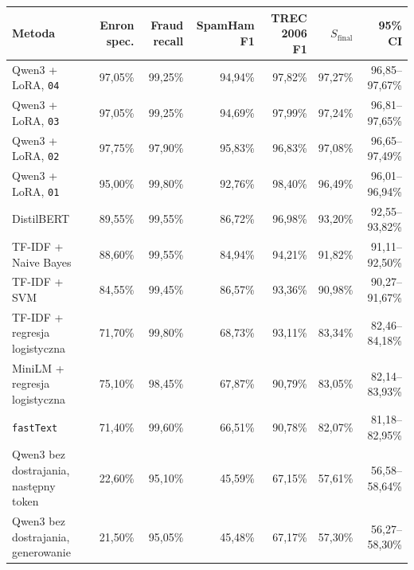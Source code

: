 \begin{tabular}{lrrrrrr}
\hline
\textbf{Metoda} & \textbf{Enron spec.} & \textbf{Fraud recall} & \textbf{SpamHam F1} & \textbf{TREC 2006 F1} & \textbf{\(S_{\mathrm{final}}\)} & \textbf{95\% CI} \\
\hline
Qwen3 + LoRA, \texttt{04} & 97,05\% & 99,25\% & 94,94\% & 97,82\% & 97,27\% & 96,85--97,67\% \\
Qwen3 + LoRA, \texttt{03} & 97,05\% & 99,25\% & 94,69\% & 97,99\% & 97,24\% & 96,81--97,65\% \\
Qwen3 + LoRA, \texttt{02} & 97,75\% & 97,90\% & 95,83\% & 96,83\% & 97,08\% & 96,65--97,49\% \\
Qwen3 + LoRA, \texttt{01} & 95,00\% & 99,80\% & 92,76\% & 98,40\% & 96,49\% & 96,01--96,94\% \\
DistilBERT & 89,55\% & 99,55\% & 86,72\% & 96,98\% & 93,20\% & 92,55--93,82\% \\
TF-IDF + Naive Bayes & 88,60\% & 99,55\% & 84,94\% & 94,21\% & 91,82\% & 91,11--92,50\% \\
TF-IDF + SVM & 84,55\% & 99,45\% & 86,57\% & 93,36\% & 90,98\% & 90,27--91,67\% \\
TF-IDF + regresja logistyczna & 71,70\% & 99,80\% & 68,73\% & 93,11\% & 83,34\% & 82,46--84,18\% \\
MiniLM + regresja logistyczna & 75,10\% & 98,45\% & 67,87\% & 90,79\% & 83,05\% & 82,14--83,93\% \\
\texttt{fastText} & 71,40\% & 99,60\% & 66,51\% & 90,78\% & 82,07\% & 81,18--82,95\% \\
Qwen3 bez dostrajania, następny token & 22,60\% & 95,10\% & 45,59\% & 67,15\% & 57,61\% & 56,58--58,64\% \\
Qwen3 bez dostrajania, generowanie & 21,50\% & 95,05\% & 45,48\% & 67,17\% & 57,30\% & 56,27--58,30\% \\
\hline
\end{tabular}
